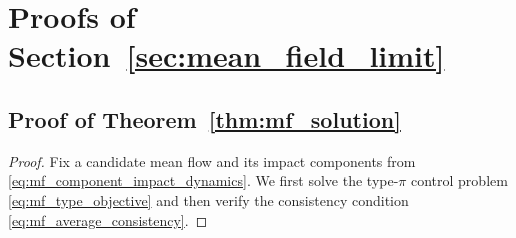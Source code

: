 \documentclass[12pt]{article}
\numberwithin{equation}{section}
\theoremstyle{definition}
\begin{document}
\section{Proofs of Section~\ref{sec:mean_field_limit}}
\label{sec:proofs_mean_field_limit}

\subsection{Proof of Theorem~\ref{thm:mf_solution}}
\label{subsec:proof_mf_solution}

\begin{proof}
Fix a candidate mean flow and its impact components from
\eqref{eq:mf_component_impact_dynamics}. We first solve the type-\(\pi\)
control problem \eqref{eq:mf_type_objective} and then verify the consistency
condition \eqref{eq:mf_average_consistency}.


\end{proof}
\end{document}
